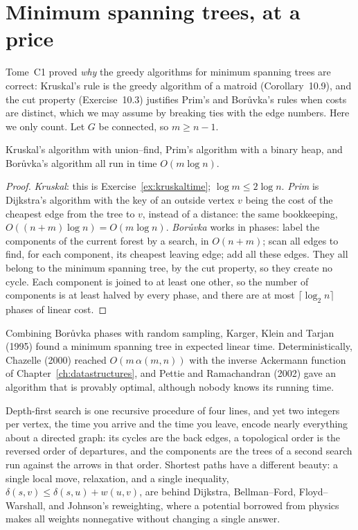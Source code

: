 \section{Minimum spanning trees, at a price}\label{sec:mst}

Tome~C1 proved \emph{why} the greedy algorithms for minimum spanning trees are correct: Kruskal's rule is the greedy algorithm of a matroid (Corollary~10.9), and the cut property (Exercise~10.3) justifies Prim's
and Bor\r{u}vka's rules when costs are distinct, which we may assume by breaking ties with the edge numbers. Here we only count. Let $G$ be connected, so $m\ge n-1$.

\begin{proposition}\label{prop:mstcost}
Kruskal's algorithm with union--find, Prim's algorithm with a binary heap, and Bor\r{u}vka's algorithm all run in time $O(m\log n)$.
\end{proposition}
\begin{proof}
\emph{Kruskal}: this is Exercise~\ref{ex:kruskaltime}; $\log m\le2\log n$. \emph{Prim} is Dijkstra's algorithm with the key of an outside vertex $v$ being the cost of the cheapest edge from the tree to $v$, instead of a distance: the
same bookkeeping, $O((n+m)\log n)=O(m\log n)$. \emph{Bor\r{u}vka} works in phases: label the components of the current forest by a search, in $O(n+m)$; scan all edges to find, for each component, its cheapest leaving edge;
add all these edges. They all belong to the minimum spanning tree, by the cut property, so they create no cycle. Each component is joined to at least one other, so the number of components is at least halved by every
phase, and there are at most $\lceil\log_2n\rceil$ phases of linear cost.
\end{proof}

\begin{remark}
Combining Bor\r{u}vka phases with random sampling, Karger, Klein and Tarjan (1995) found a minimum spanning tree in expected linear time. Deterministically, Chazelle (2000) reached $O(m\,\alpha(m,n))$ with the inverse Ackermann
function of Chapter~\ref{ch:datastructures}, and Pettie and Ramachandran (2002) gave an algorithm that is provably optimal, although nobody knows its running time.
\end{remark}

\begin{beauty}
Depth-first search is one recursive procedure of four lines, and yet two integers per vertex, the time you arrive and the time you leave, encode nearly everything about a
directed graph: its cycles are the back edges, a topological order is the reversed order of departures, and the components are the trees of a second search run against the
arrows in that order. Shortest paths have a different beauty: a single local move, relaxation, and a single inequality, $\delta(s,v)\le\delta(s,u)+w(u,v)$, are behind
Dijkstra, Bellman--Ford, Floyd--Warshall, and Johnson's reweighting, where a potential borrowed from physics makes all weights nonnegative without changing a single answer.
\end{beauty}

